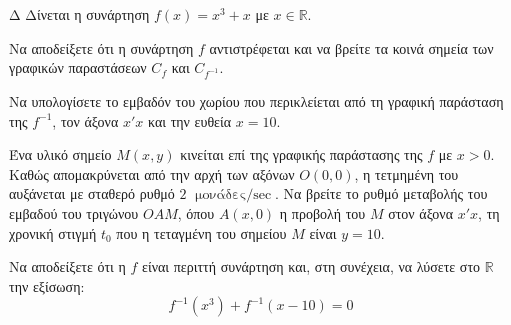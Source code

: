 \begin{thema}{Δ}
Δίνεται η συνάρτηση $f(x) = x^3 + x$ με $x \in \mathbb{R}$.
\begin{erwthma}
    \item Να αποδείξετε ότι η συνάρτηση $f$ αντιστρέφεται και να βρείτε τα κοινά σημεία των γραφικών παραστάσεων $C_f$ και $C_{f^{-1}}$.
    \item Να υπολογίσετε το εμβαδόν του χωρίου που περικλείεται από τη γραφική παράσταση της $f^{-1}$, τον άξονα $x'x$ και την ευθεία $x = 10$.
    \item Ένα υλικό σημείο $M(x, y)$ κινείται επί της γραφικής παράστασης της $f$ με $x > 0$. Καθώς απομακρύνεται από την αρχή των αξόνων $O(0,0)$, η τετμημένη του αυξάνεται με σταθερό ρυθμό $2 \text{ μονάδες/$\sec$}$. Να βρείτε το ρυθμό μεταβολής του εμβαδού του τριγώνου $OAM$, όπου $A(x, 0)$ η προβολή του $M$ στον άξονα $x'x$, τη χρονική στιγμή $t_0$ που η τεταγμένη του σημείου $M$ είναι $y = 10$.
    \item Να αποδείξετε ότι η $f$ είναι περιττή συνάρτηση και, στη συνέχεια, να λύσετε στο $\mathbb{R}$ την εξίσωση:
    \[ f^{-1}(x^3) + f^{-1}(x - 10) = 0 \]
\end{erwthma}
\end{thema}
